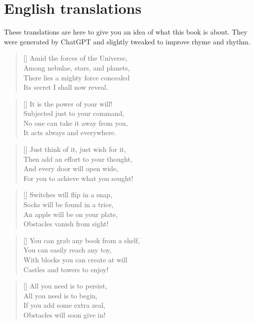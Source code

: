 \section*{English translations}
These translations are here to give you an idea of what this book is about. They were generated by ChatGPT and slightly tweaked to improve rhyme and rhythm.


\PlainPoemTitle
{}
\begin{multicols}{2}
	
	
	\begin{verse}[\versewidth]
		Amid the forces of the Universe,\\
		Among nebulae, stars, and planets,\\
		There lies a mighty force concealed\\
		Its secret I shall now reveal.
	\end{verse}
	
	\begin{verse}[\versewidth]
		It is the power of your will!\\
		Subjected just to your command,\\
		No one can take it away from you,\\
		It acts always and everywhere.
	\end{verse}
	
	\begin{verse}[\versewidth]
		Just think of it, just wish for it,\\
		Then add an effort to your thought,\\
		And every door will open wide,\\
		For you to achieve what you sought!
	\end{verse}
	
	
	\begin{verse}[\versewidth]
		Switches will flip in a snap,\\
		Socks will be found in a trice,\\
		An apple will be on your plate,\\
		Obstacles vanish from sight!
	\end{verse}
	
	\begin{verse}[\versewidth]
		You can grab any book from a shelf,\\
		You can easily reach any toy,\\
		With blocks you can create at will\\
		Castles and towers to enjoy!
	\end{verse}
	
	\begin{verse}[\versewidth]
		All you need is to persist,\\
		All you need is to begin,\\
		If you add some extra zeal,\\
		Obstacles will soon give in!
	\end{verse}
	
	
\end{multicols}
